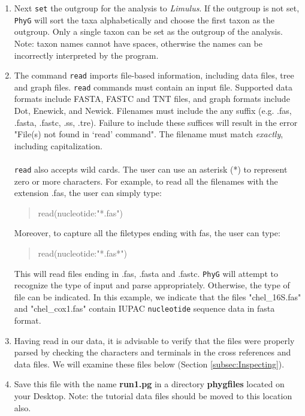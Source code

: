 \documentclass[11pt]{article}
\newcommand{\phyg}{\texttt{PhyG} }
\begin{document}
\begin{enumerate}
\item Next \texttt{set} the outgroup for the analysis to \textit{Limulus}. If the outgroup
is not set, \phyg will sort the taxa alphabetically and choose the first taxon as the
outgroup. Only a single taxon can be set as the outgroup of the analysis. Note: taxon 
names cannot have spaces, otherwise the names can be incorrectly interpreted by
the program.

\item The command \texttt{read} imports file-based information, including data files, 
tree and graph files. \texttt{read} commands must contain an input file. Supported 
data formats include FASTA, FASTC and TNT files, and graph formats include Dot, 
Enewick, and Newick. Filenames must include the any suffix (e.g. 
.fas, .fasta, .fastc, .ss, .tre). Failure to include these suffices will result in the error 
"File(s) not found in `read' command". The filename must match \textit{exactly}, 
including capitalization.\\
\\
\texttt{read} also accepts wild cards. The user can use an asterisk (*) to represent 
zero or more characters. For example, to read all the filenames with the extension .fas, 
the user can simply type:
        
        \begin{quote}
	read(nucleotide:"*.fas")\\
	\end{quote}
	
Moreover, to capture all the filetypes ending with fas, the user can type: 
	
	\begin{quote}
	read(nucleotide:"*.fas*")\\
	\end{quote}

This will read files ending in .fas, .fasta and .fastc. \phyg will attempt to recognize 
the type of input and parse appropriately. Otherwise, the type of file can be 
indicated. In this example, we indicate that the files "chel\_16S.fas" and 
"chel\_cox1.fas" contain IUPAC \texttt{nucleotide} sequence data in fasta format.

\item Having read in our data, it is advisable to verify that the files were properly 
parsed by checking the characters and terminals in the cross references and data 
files. We will examine these files below (Section \ref{subsec:Inspecting}).

\item Save this file with the name \textbf{run1.pg} in a directory \textbf{phygfiles} 
located on your Desktop. Note: the tutorial data files should be moved to this 
location also.

\end{enumerate}
\end{document}
